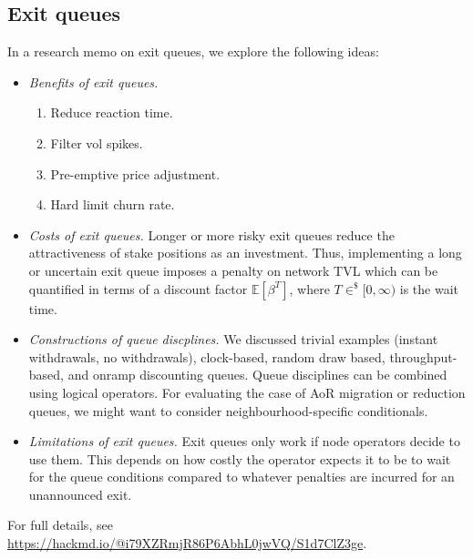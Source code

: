 \subsection*{Exit queues}

In a research memo on exit queues, we explore the following ideas:
%
\begin{itemize}
  \item \emph{Benefits of exit queues.}
  \begin{enumerate}
    \item Reduce reaction time.
    \item Filter vol spikes.
    \item Pre-emptive price adjustment.
    \item Hard limit churn rate.
  \end{enumerate}
  \item \emph{Costs of exit queues.}
  Longer or more risky exit queues reduce the attractiveness of stake positions as an investment. 
  Thus, implementing a long or uncertain exit queue imposes a penalty on network TVL which can be quantified in terms of a discount factor $\mathbb{E}[\beta^T]$, where $T\in^\$[0,\infty)$ is the wait time.
  \item \emph{Constructions of queue discplines.} 
    We discussed trivial examples (instant withdrawals, no withdrawals), clock-based, random draw based, throughput-based, and onramp discounting queues.
    Queue disciplines can be combined using logical operators.
    For evaluating the case of AoR migration or reduction queues, we might want to consider neighbourhood-specific conditionals.

  \item \emph{Limitations of exit queues.} Exit queues only work if node operators decide to use them. This depends on how costly the operator expects it to be to wait for the queue conditions compared to whatever penalties are incurred for an unannounced exit.

\end{itemize}
%
For full details, see \url{https://hackmd.io/@i79XZRmjR86P6AbhL0jwVQ/S1d7ClZ3ge}.